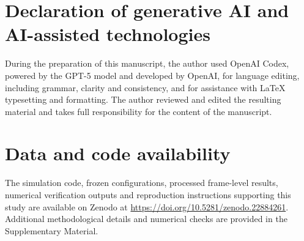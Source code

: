 \documentclass{edpsci}
\begin{document}
\section*{Declaration of generative AI and AI-assisted technologies}

During the preparation of this manuscript, the author used OpenAI Codex, powered by the GPT-5 model and developed by OpenAI, for language editing, including grammar, clarity and consistency, and for assistance with \LaTeX{} typesetting and formatting. The author reviewed and edited the resulting material and takes full responsibility for the content of the manuscript.

\section*{Data and code availability}

The simulation code, frozen configurations, processed frame-level results, numerical verification outputs and reproduction instructions supporting this study are available on Zenodo at \url{https://doi.org/10.5281/zenodo.22884261}. Additional methodological details and numerical checks are provided in the Supplementary Material.



\begingroup{}

\endgroup
\end{document}
